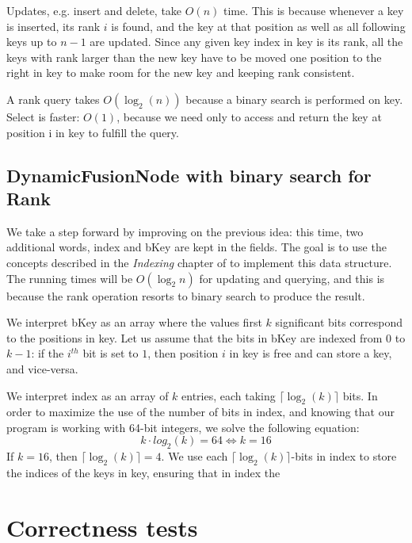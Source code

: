 Updates, e.g. insert and delete, take $O(n)$ time. This is because whenever a key is inserted, its rank $i$ is found, and the key at that position as well as all following keys up to $n-1$ are updated. Since any given key index in {\ttfamily key} is its rank, all the keys with rank larger than the new key have to be moved one position to the right in {\ttfamily key} to make room for the new key and keeping rank consistent.

A rank query takes $O(\log_2(n))$ because a binary search is performed on {\ttfamily key}. Select is faster: $O(1)$, because we need only to access and return the key at position {\ttfamily i} in {\ttfamily key} to fulfill the query.

\section{DynamicFusionNode with binary search for Rank}
We take a step forward by improving on the previous idea: this time, two additional words, {\ttfamily index} and {\ttfamily bKey} are kept in the fields. The goal is to use the concepts described in the \textit{Indexing} chapter of \cite{patrascu2014dynamic} to implement this data structure. The running times will be $O(\log_2 n)$ for updating and querying, and this is because the {\ttfamily rank} operation resorts to binary search to produce the result.

We interpret {\ttfamily bKey} as an array where the values first $k$ significant bits correspond to the positions in {\ttfamily key}. Let us assume that the bits in {\ttfamily bKey} are indexed from $0$ to $k-1$: if the $i^{th}$ bit is set to $1$, then position $i$ in {\ttfamily key} is free and can store a key, and vice-versa.

We interpret {\ttfamily index} as an array of $k$ entries, each taking $\lceil \log_2(k) \rceil$ bits. In order to maximize the use of the number of bits in {\ttfamily index}, and knowing that our program is working with 64-bit integers, we solve the following equation:
\begin{equation}
    k \cdot log_2(k) = 64 \iff k = 16
\end{equation}
If $k=16$, then $\lceil \log_2(k) \rceil = 4$. We use each $\lceil \log_2(k) \rceil$-bits in {\ttfamily index} to store the indices of the keys in {\ttfamily key}, ensuring that in {\ttfamily index} the

\chapter{Correctness tests}

